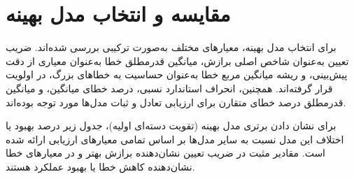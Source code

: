 \section{مقایسه و انتخاب مدل بهینه}

برای انتخاب مدل بهینه، معیارهای مختلف به‌صورت ترکیبی بررسی شده‌اند. ضریب تعیین به‌عنوان شاخص اصلی برازش، میانگین قدرمطلق خطا به‌عنوان معیاری از دقت پیش‌بینی، و ریشه میانگین مربع خطا به‌عنوان حساسیت به خطاهای بزرگ، در اولویت قرار گرفته‌اند. همچنین، انحراف استاندارد نسبی، درصد خطای میانگین، و میانگین قدرمطلق درصد خطای متقارن برای ارزیابی تعادل و ثبات مدل‌ها مورد توجه بوده‌اند.

برای نشان دادن برتری مدل بهینه (تقویت دسته‌ای اولیه)، جدول زیر درصد بهبود یا اختلاف این مدل نسبت به سایر مدل‌ها بر اساس تمامی معیارهای ارزیابی ارائه شده است. مقادیر مثبت در ضریب تعیین نشان‌دهنده برازش بهتر و در معیارهای خطا نشان‌دهنده کاهش خطا یا بهبود عملکرد هستند.
